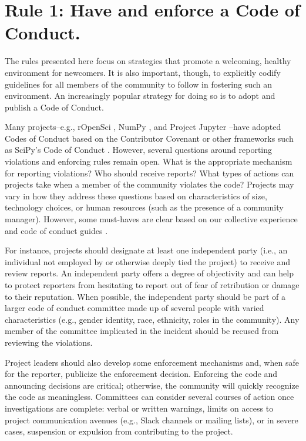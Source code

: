 \documentclass[10pt,letterpaper]{article}
\newcommand{\rulemajor}[1]{\section{#1}}
\begin{document}
\rulemajor{Rule 1: Have and enforce a Code of Conduct.}

The rules presented here focus on strategies that promote a welcoming, healthy environment for newcomers.
It is also important, though, to explicitly codify guidelines for all members of the community to follow
in fostering such an environment.
An increasingly popular strategy for doing so is to adopt and publish a Code of Conduct.

Many projects--e.g., rOpenSci \cite{ropensci-coc}, NumPy \cite{numpy-coc}, and Project Jupyter \cite{jupyter-coc}--have adopted Codes of Conduct
based on the Contributor Covenant \cite{covenant}
or other frameworks such as SciPy's Code of Conduct \cite{scipy-coc}.
However, several questions around reporting violations and enforcing rules remain open.
What is the appropriate mechanism for reporting violations?
Who should receive reports?
What types of actions can projects take when a member of the community violates the code?
Projects may vary in how they address these questions based on characteristics of size, technology choices, or human resources
(such as the presence of a community manager).
However, some must-haves are clear based on our collective experience and code of conduct guides \cite{aurora2019}.

For instance,
projects should designate at least one independent party
(i.e., an individual not employed by or otherwise deeply tied the project)
to receive and review reports.
An independent party offers a degree of objectivity
and can help to protect reporters from hesitating to report out of fear of retribution or damage to their reputation.
When possible,
the independent party should be part of a larger code of conduct committee made up of several people with varied characteristics
(e.g., gender identity, race, ethnicity, roles in the community).
Any member of the committee implicated in the incident should be recused from reviewing the violations.

Project leaders should also develop some enforcement mechanisms and,
when safe for the reporter,
publicize the enforcement decision.
Enforcing the code and announcing decisions are critical;
otherwise,
the community will quickly recognize the code as meaningless.
Committees can consider several courses of action once investigations are complete:
verbal or written warnings,
limits on access to project communication avenues (e.g., Slack channels or mailing lists),
or in severe cases,
suspension or expulsion from contributing to the project.
\end{document}
